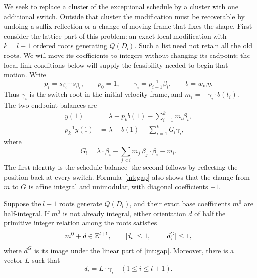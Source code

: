 We seek to replace a cluster of the exceptional schedule by a cluster
with one additional switch.  Outside that cluster the modification
must be recoverable by undoing a suffix reflection or a change of
moving frame that fixes the shape.  First consider the lattice part
of this problem: an exact local modification with \(k=l+1\) ordered
roots generating \(Q(D_l)\).  Such a list need not retain all the old
roots.  We will move its coefficients to integers without changing
its endpoint; the local-link conditions below will supply the
feasibility needed to begin that motion.  Write
\[
 p_i=s_{\beta_i}\cdots s_{\beta_1},\qquad p_0=1,
 \qquad \gamma_i=p_{i-1}^{-1}\beta_i,
 \qquad b=w_{\mathrm{in}}\eta.
\]
Thus \(\gamma_i\) is the switch root in the initial velocity frame, and
\(m_i=-\gamma_i\cdot b(t_i)\).  The two endpoint balances are
\begin{align}
 y(1)&=\lambda+p_k b(1)-\sum_{i=1}^k m_i\beta_i,
 \label{int:position-balance}\\
 p_k^{-1}y(1)&=\lambda+b(1)-\sum_{i=1}^k G_i\gamma_i,
 \label{int:velocity-balance}
\end{align}
where
\begin{equation}\label{int:gap}
 G_i=\lambda\cdot\beta_i
       -\sum_{j<i}m_j\,\beta_j\cdot\beta_i-m_i.
\end{equation}
The first identity is the schedule balance; the second follows by
reflecting the position back at every switch.  Formula~\eqref{int:gap}
also shows that the change from \(m\) to \(G\) is affine integral and
unimodular, with diagonal coefficients \(-1\).

\begin{lemma}\label{int:half-kernel}
Suppose the \(l+1\) roots generate \(Q(D_l)\), and their exact base
coefficients \(m^0\) are half-integral.  If \(m^0\) is not already
integral, either orientation \(d\) of half the primitive integer
relation among the roots satisfies
\begin{equation}\label{int:half-bounds}
 m^0+d\in\mathbb Z^{l+1},\qquad |d_i|\le1,\qquad |d_i^G|\le1,
\end{equation}
where \(d^G\) is its image under the linear part of
\eqref{int:gap}.  Moreover, there is a vector \(L\) such that
\begin{equation}\label{int:potential-direction}
 d_i=L\cdot\gamma_i\quad(1\le i\le l+1).
\end{equation}
\end{lemma}

